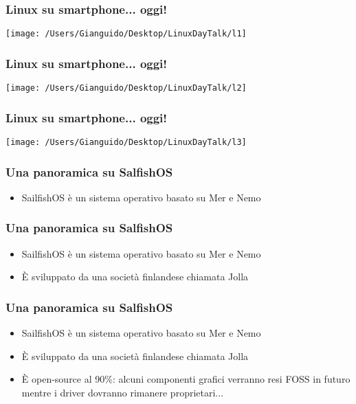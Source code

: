 \documentclass[12pt]{beamer}
\begin{document}
\begin{frame}
\frametitle{Linux su smartphone... oggi!}
\begin{center}
\texttt{[image: /Users/Gianguido/Desktop/LinuxDayTalk/l1]}
\end{center}
\end{frame}

\begin{frame}
\frametitle{Linux su smartphone... oggi!}
\begin{center}
\texttt{[image: /Users/Gianguido/Desktop/LinuxDayTalk/l2]}
\end{center}
\end{frame}

\begin{frame}
\frametitle{Linux su smartphone... oggi!}
\begin{center}
\texttt{[image: /Users/Gianguido/Desktop/LinuxDayTalk/l3]}
\end{center}
\end{frame}

\begin{frame}
\frametitle{Una panoramica su SalfishOS}
\begin{itemize}
\item SailfishOS è un sistema operativo basato su Mer e Nemo
\end{itemize}
\end{frame}

\begin{frame}
\frametitle{Una panoramica su SalfishOS}
\begin{itemize}
\item SailfishOS è un sistema operativo basato su Mer e Nemo
\item È sviluppato da una società finlandese chiamata Jolla
\end{itemize}
\end{frame}

\begin{frame}
\frametitle{Una panoramica su SalfishOS}
\begin{itemize}
\item SailfishOS è un sistema operativo basato su Mer e Nemo
\item È sviluppato da una società finlandese chiamata Jolla
\item È open-source al 90\%: alcuni componenti grafici verranno resi FOSS in futuro mentre i driver dovranno rimanere proprietari...
\end{itemize}
\end{frame}
\end{document}
